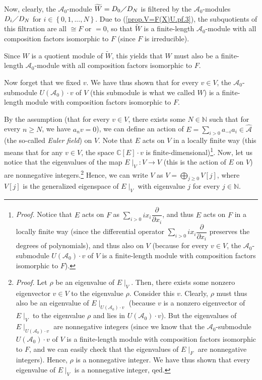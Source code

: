 \documentclass
[numbers=enddot,12pt,final,onecolumn,german,notitlepage]{scrartcl}%
\theoremstyle{definition}
\begin{document}
Now, clearly, the $\mathcal{A}_{0}$-module $\widetilde{W}=D_{0}\diagup D_{N}$
is filtered by the $\mathcal{A}_{0}$-modules $D_{i}\diagup D_{N}$ for
$i\in\left\{  0,1,...,N\right\}  $. Due to (\ref{prop.V=F(X)U.pf.3}), the
subquotients of this filtration are all $\cong F$ or $=0$, so that
$\widetilde{W}$ is a finite-length $\mathcal{A}_{0}$-module with all
composition factors isomorphic to $F$ (since $F$ is irreducible).

Since $W$ is a quotient module of $\widetilde{W}$, this yields that $W$ must
also be a finite-length $\mathcal{A}_{0}$-module with all composition factors
isomorphic to $F$.

Now forget that we fixed $v$. We have thus shown that for every $v\in V$, the
$\mathcal{A}_{0}$-submodule $U\left(  \mathcal{A}_{0}\right)  \cdot v$ of $V$
(this submodule is what we called $W$) is a finite-length module with
composition factors isomorphic to $F$.

By the assumption (that for every $v\in V$, there exists some $N\in\mathbb{N}$
such that for every $n\geq N$, we have $a_{n}v=0$), we can define an action of
$E=\sum\limits_{i>0}a_{-i}a_{i}\in\widehat{\mathcal{A}}$ (the so-called
\textit{Euler field}) on $V$. Note that $E$ acts on $V$ in a locally finite
way (this means that for any $v\in V$, the space $\mathbb{C}\left[  E\right]
\cdot v$ is finite-dimensional)\footnote{\textit{Proof.} Notice that $E$ acts
on $F$ as $\sum\limits_{i>0}ix_{i}\dfrac{\partial}{\partial x_{i}}$, and thus
$E$ acts on $F$ in a locally finite way (since the differential operator
$\sum\limits_{i>0}ix_{i}\dfrac{\partial}{\partial x_{i}}$ preserves the
degrees of polynomials), and thus also on $V$ (because for every $v\in V$, the
$\mathcal{A}_{0}$-submodule $U\left(  \mathcal{A}_{0}\right)  \cdot v$ of $V$
is a finite-length module with composition factors isomorphic to $F$).}. Now,
let us notice that the eigenvalues of the map $E\mid_{V}:V\rightarrow V$ (this
is the action of $E$ on $V$) are nonnegative
integers.\footnote{\textit{Proof.} Let $\rho$ be an eigenvalue of $E\mid_{V}$.
Then, there exists some nonzero eigenvector $v\in V$ to the eigenvalue $\rho$.
Consider this $v$. Clearly, $\rho$ must thus also be an eigenvalue of
$E\mid_{U\left(  \mathcal{A}_{0}\right)  \cdot v}$ (because $v$ is a nonzero
eigenvector of $E\mid_{V}$ to the eigenvalue $\rho$ and lies in $U\left(
\mathcal{A}_{0}\right)  \cdot v$). But the eigenvalues of $E\mid_{U\left(
\mathcal{A}_{0}\right)  \cdot v}$ are nonnegative integers (since we know that
the $\mathcal{A}_{0}$-submodule $U\left(  \mathcal{A}_{0}\right)  \cdot v$ of
$V$ is a finite-length module with composition factors isomorphic to $F$, and
we can easily check that the eigenvalues of $E\mid_{F}$ are nonnegative
integers). Hence, $\rho$ is a nonnegative integer. We have thus shown that
every eigenvalue of $E\mid_{V}$ is a nonnegative integer, qed.} Hence, we can
write $V$ as $V=\bigoplus\limits_{j\geq0}V\left[  j\right]  $, where $V\left[
j\right]  $ is the generalized eigenspace of $E\mid_{V}$ with eigenvalue $j$
for every $j\in\mathbb{N}$.
\end{document}
